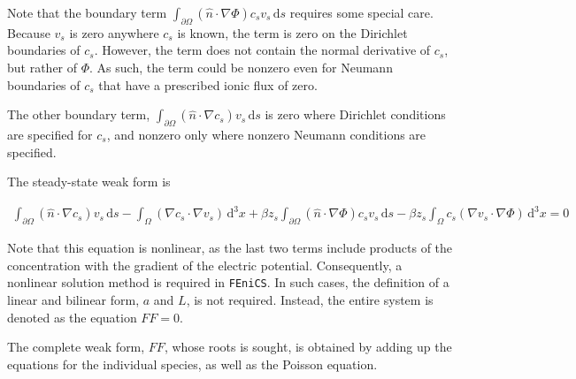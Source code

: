Note that the boundary term
$\int_{\partial\Omega} \left( \hat{n} \cdot \nabla \Phi \right) c_s v_s \,\mathrm{d}s$
requires some special care.
Because $v_s$ is zero anywhere $c_s$ is known,
the term is zero on the Dirichlet boundaries of $c_s$.
However, the term does not contain the normal derivative of $c_s$,
but rather of $\Phi$.
As such, the term could be nonzero even for Neumann boundaries of $c_s$
that have a prescribed ionic flux of zero.

The other boundary term, $\int_{\partial\Omega} \left( \hat{n} \cdot \nabla c_s \right) v_s \,\mathrm{d}s$
is zero where Dirichlet conditions are specified for $c_s$,
and nonzero only where nonzero Neumann conditions are specified.

The steady-state weak form is

\begin{equation}
\begin{aligned}
\int_{\partial\Omega} \left( \hat{n} \cdot \nabla c_s \right) v_s \,\mathrm{d}s
- \int_\Omega \left( \nabla c_s \cdot \nabla v_s \right) \,\mathrm{d}^3x 
+ \beta z_s \int_{\partial\Omega} \left( \hat{n} \cdot \nabla \Phi \right) c_s v_s \,\mathrm{d}s
- \beta z_s \int_\Omega c_s  \left( \nabla v_s \cdot \nabla \Phi \right) \,\mathrm{d}^3x
 = 0
\end{aligned}
\end{equation}

Note that this equation is nonlinear, as the last two terms include products of the concentration
with the gradient of the electric potential.
Consequently, a nonlinear solution method is required in \texttt{FEniCS}.
In such cases, the definition of a linear and bilinear form, $a$ and $L$,
is not required.
Instead, the entire system is denoted as the equation $FF = 0$.

The complete weak form, $FF$, whose roots is sought, is obtained by adding up the equations for the individual species,
as well as the Poisson equation.

